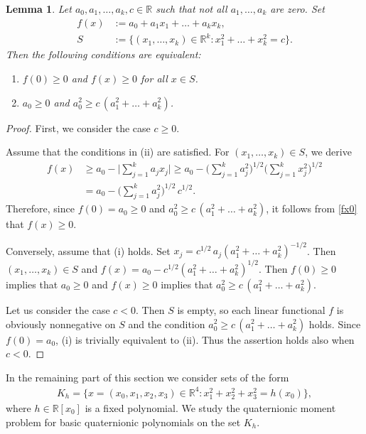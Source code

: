 \documentclass[11pt,a4paper]{amsart}
\newtheorem{lemma}[theorem]{Lemma}
\theoremstyle{definition}
\begin{document}
\begin{lemma}%
\label{auxlemma}
Let $a_{0},a_{1},\ldots ,a_{k},c\in \mathbb{R}$ such that not all
$a_{1},\ldots , a_{k}$ are zero. Set
%
\begin{align}
f(x) &:= a_{0}+a_{1}x_{1}+\ldots +a_{k}x_{k},
\label{fedfi}
\\
S &:=\{(x_{1},\ldots ,x_{k})\in \mathbb{R}^{k}: x_{1}^{2}+\ldots +x_{k}^{2}=c
\}.
\nonumber
\end{align}
%
Then the following conditions are equivalent:
%
\begin{enumerate}
%
\item[\emph{(i)}] $f(0)\geq 0$ and $f(x)\geq 0$ for all $x\in S$.
%
\item[\emph{(ii)}] $a_{0}\geq 0$ and
$a_{0}^{2} \geq c \, (a_{1}^{2}+\ldots +a_{k}^{2})$.
%
\end{enumerate}
%
\end{lemma}

\begin{proof}
First, we consider the case $c\geq 0$.

Assume that the conditions in (ii) are satisfied. For
$(x_{1},\ldots ,x_{k})\in S$, we derive
%
\begin{align}
f(x) &\geq a_{0}-\Big|\sum _{j=1}^{k} a_{j}x_{j}\Big|\geq a_{0}-\Big(
\sum _{j=1}^{k} a_{j}^{2}\Big)^{1/2}\Big(\sum _{j=1}^{k} x_{j}^{2}
\Big)^{1/2}
\nonumber
\\
&= a_{0}-\Big(\sum _{j=1}^{k} a_{j}^{2}\Big)^{1/2}\, c^{1/2}.
\label{fx0}
\end{align}
%
Therefore, since $f(0)=a_{0}\geq 0$ and
$a_{0}^{2} \geq c \, (a_{1}^{2}+\ldots +a_{k}^{2})$, it follows from \eqref{fx0} that $f(x)\geq 0$.

Conversely, assume that (i) holds. Set
$x_{j}=c^{1/2}\, a_{j}(a_{1}^{2}+\ldots +a_{k}^{2})^{-1/2}$. Then
$(x_{1},\ldots ,x_{k})\in S$ and
$f(x)=a_{0}-c^{1/2} (a_{1}^{2}+\ldots +a_{k}^{2})^{1/2}$. Then
$f(0)\geq 0$ implies that $a_{0} \geq 0$ and $f(x)\geq 0$ implies that
$a_{0}^{2} \geq c \, (a_{1}^{2}+\ldots +a_{k}^{2})$.

Let us consider the case $c<0$. Then $S$ is empty, so each linear functional
$f$ is obviously nonnegative on $S$ and the condition
$a_{0}^{2} \geq c \, (a_{1}^{2}+\ldots +a_{k}^{2})$ holds. Since
$f(0)=a_{0}$, (i) is trivially equivalent to (ii). Thus the assertion holds
also when $c<0$.
\end{proof}

In the remaining part of this section we consider sets of the form
%
\begin{align}
\label{defK}
K_{h}=\{x=(x_{0},x_{1},x_{2},x_{3})\in \mathbb{R}^{4}: x_{1}^{2}+x_{2}^{2}+x_{3}^{2}=h(x_{0})
\},
\end{align}
%
where $h\in \mathbb{R}[x_{0}]$ is a fixed polynomial. We study the quaternionic
moment problem for basic quaternionic polynomials on the set $K_{h}$.
\end{document}
